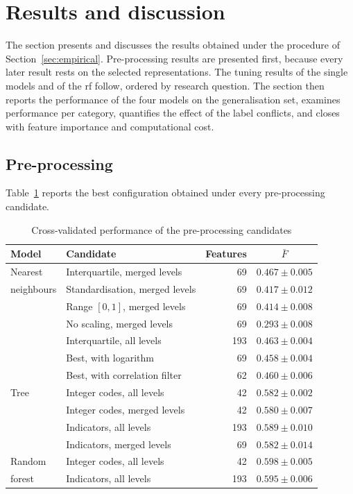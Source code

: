 \section{Results and discussion}
\label{sec:results}

The section presents and discusses the results obtained under the procedure
of Section~\ref{sec:empirical}. Pre-processing results are presented first,
because every later result rests on the selected representations. The tuning
results of the single models and of the \gls{rf} follow, ordered by research
question. The section then reports the performance of the four models on the
generalisation set, examines performance per category, quantifies the effect
of the label conflicts, and closes with feature importance and computational
cost.

\subsection{Pre-processing}
\label{sec:res-prep}

Table~\ref{tab:prep} reports the best configuration obtained under every
pre-processing candidate.

\begin{table}[!t]
\centering
\caption{Cross-validated performance of the pre-processing candidates}
\label{tab:prep}
\begin{tabular}{@{}llrc@{}}
\toprule
\textbf{Model} & \textbf{Candidate} & \textbf{Features} & $\bar{F}$ \\
\midrule
Nearest      & Interquartile, merged levels   & 69  & $\mathbf{0.467 \pm 0.005}$ \\
neighbours   & Standardisation, merged levels & 69  & $0.417 \pm 0.012$ \\
             & Range $[0,1]$, merged levels   & 69  & $0.414 \pm 0.008$ \\
             & No scaling, merged levels      & 69  & $0.293 \pm 0.008$ \\
             & Interquartile, all levels      & 193 & $0.463 \pm 0.004$ \\
             & Best, with logarithm           & 69  & $0.458 \pm 0.004$ \\
             & Best, with correlation filter  & 62  & $0.460 \pm 0.006$ \\
\midrule
Tree         & Integer codes, all levels      & 42  & $0.582 \pm 0.002$ \\
             & Integer codes, merged levels   & 42  & $0.580 \pm 0.007$ \\
             & Indicators, all levels         & 193 & $\mathbf{0.589 \pm 0.010}$ \\
             & Indicators, merged levels      & 69  & $0.582 \pm 0.014$ \\
\midrule
Random       & Integer codes, all levels      & 42  & $\mathbf{0.598 \pm 0.005}$ \\
forest       & Indicators, all levels         & 193 & $0.595 \pm 0.006$ \\
\bottomrule
\end{tabular}
\end{table}

